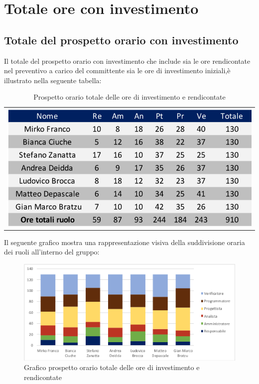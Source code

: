\section{Totale ore con investimento}
\subsection{Totale del prospetto orario con investimento}
Il totale del prospetto orario con investimento che include sia le ore rendicontate nel preventivo a carico del committente sia le ore di investimento iniziali,è illustrato nella seguente tabella:

\begin{table}[!ht]
	\begin{center}
		\begin{tabular}{c}
			\includegraphics[scale=0.80]{images/tabellaOreInvestimento.png}
		\end{tabular}
		\caption{Prospetto orario totale delle ore di investimento e rendicontate}
	\end{center}
\end{table}

Il seguente grafico mostra una rappresentazione visiva della suddivisione oraria dei ruoli all'interno del gruppo:
\begin{figure}[!ht]
	\begin{center}
		\includegraphics[scale=0.80]{images/grafoOreInvestimento.png}
		\caption{Grafico prospetto orario totale delle ore di investimento e rendicontate}
	\end{center}
\end{figure}

